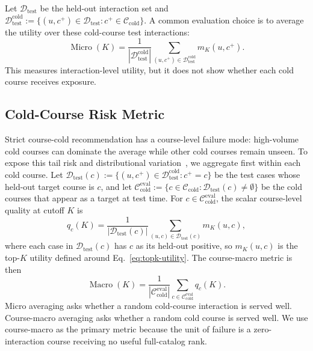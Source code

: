 \documentclass[letterpaper]{article}
\begin{document}
Let \(\mathcal{D}_{\mathrm{test}}\) be the held-out interaction set and \(\mathcal{D}^{\mathrm{cold}}_{\mathrm{test}}:=\{(u,c^+)\in\mathcal{D}_{\mathrm{test}}:c^+\in\mathcal{C}_{\mathrm{cold}}\}\). A common evaluation choice is to average the utility over these cold-course test interactions:
\begin{equation}
\operatorname{Micro}(K)=
\frac{1}{|\mathcal{D}^{\mathrm{cold}}_{\mathrm{test}}|}
\sum_{(u,c^+)\in \mathcal{D}^{\mathrm{cold}}_{\mathrm{test}}}
m_K(u,c^+).
\end{equation}
This measures interaction-level utility, but it does not show whether each cold course receives exposure.

\subsection{Cold-Course Risk Metric}
Strict course-cold recommendation has a course-level failure mode: high-volume cold courses can dominate the average while other cold courses remain unseen. To expose this tail risk and distributional variation~\cite{ekstrand2024distributional,takehi2025diversification}, we aggregate first within each cold course. Let \(\mathcal{D}_{\mathrm{test}}(c):=\{(u,c^+)\in\mathcal{D}^{\mathrm{cold}}_{\mathrm{test}}:c^+=c\}\) be the test cases whose held-out target course is \(c\), and let \(\mathcal{C}^{\mathrm{eval}}_{\mathrm{cold}}:=\{c\in\mathcal{C}_{\mathrm{cold}}:\mathcal{D}_{\mathrm{test}}(c)\neq\emptyset\}\) be the cold courses that appear as a target at test time. For \(c\in\mathcal{C}^{\mathrm{eval}}_{\mathrm{cold}}\), the scalar course-level quality at cutoff \(K\) is
\begin{equation}
q_c(K)=
\frac{1}{|\mathcal{D}_{\mathrm{test}}(c)|}
\sum_{(u,c)\in \mathcal{D}_{\mathrm{test}}(c)}
m_K(u,c),
\end{equation}
where each case in \(\mathcal{D}_{\mathrm{test}}(c)\) has \(c\) as its held-out positive, so \(m_K(u,c)\) is the top-\(K\) utility defined around Eq.~\eqref{eq:topk-utility}. The course-macro metric is then
\begin{equation}
\operatorname{Macro}(K)=
\frac{1}{|\mathcal{C}^{\mathrm{eval}}_{\mathrm{cold}}|}
\sum_{c\in\mathcal{C}^{\mathrm{eval}}_{\mathrm{cold}}} q_c(K).
\end{equation}
Micro averaging asks whether a random cold-course interaction is served well. Course-macro averaging asks whether a random cold course is served well. We use course-macro as the primary metric because the unit of failure is a zero-interaction course receiving no useful full-catalog rank.
\end{document}
